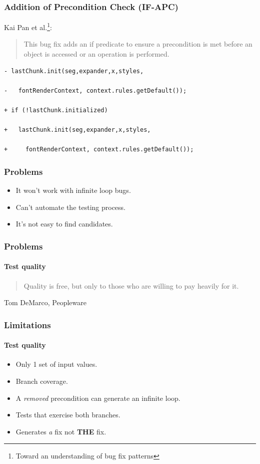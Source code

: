 \documentclass[onlymath]{beamer}
\begin{document}
\begin{frame}[fragile]
\frametitle{Addition of Precondition Check (IF-APC)}
Kai Pan et al.\footnote{Toward an understanding of bug fix patterns}:
\begin{quotation}
This bug fix adds an if predicate to ensure a precondition is met before an
object is accessed or an operation is performed.
\end{quotation}

\vspace{1em}

\begin{lstlisting}[basicstyle=\scriptsize]
- lastChunk.init(seg,expander,x,styles,

-   fontRenderContext, context.rules.getDefault());

+ if (!lastChunk.initialized)

+   lastChunk.init(seg,expander,x,styles,

+     fontRenderContext, context.rules.getDefault());
\end{lstlisting}
\end{frame}

  \frame
  {
    \frametitle{Problems}
\begin{itemize}
\item It won't work with infinite loop bugs.
\item Can't automate the testing process.
\item It's not easy to find candidates.
\end{itemize}    
  }

  \frame
  {
    \frametitle{Problems}
    \framesubtitle{Test quality}
   \begin{quote}
    Quality is free, but only to those who are willing to pay heavily for it.
   \end{quote}
    Tom DeMarco, Peopleware   
  }
  
  \frame
  {
    \frametitle{Limitations}
    \framesubtitle{Test quality}
\begin{itemize}
\item Only 1 set of input values.
\item Branch coverage.
\item A \textit{removed} precondition can generate an infinite loop.
\item Tests that exercise both branches.
\item Generates \textit{a} fix not \textbf{THE} fix.
\end{itemize}        
  }
\end{document}
